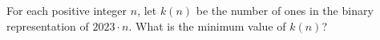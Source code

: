 \begin{problem}
    For each positive integer $n$, let $k(n)$ be the number of ones in the binary representation of $2023 \cdot n$. What is the minimum value of $k(n)$?
    \label{23PUTNAMB2}
\end{problem}